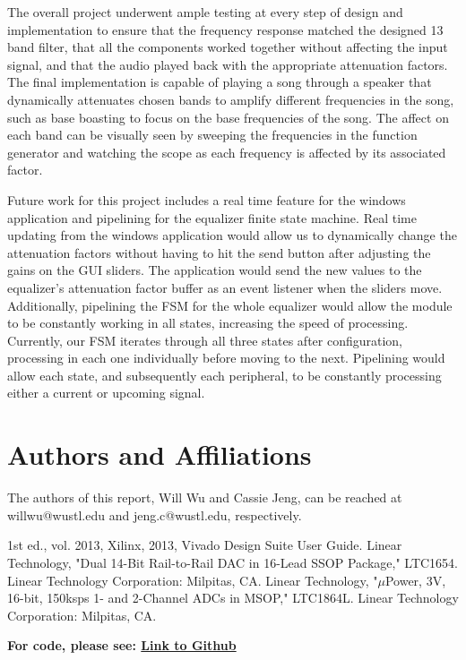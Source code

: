 \documentclass[journal]{IEEEtran} %
\begin{document}
The overall project underwent ample testing at every step of design and implementation to ensure that the frequency response matched the designed 13 band filter, that all the components worked together without affecting the input signal, and that the audio played back with the appropriate attenuation factors. The final implementation is capable of playing a song through a speaker that dynamically attenuates chosen bands to amplify different frequencies in the song, such as base boasting to focus on the base frequencies of the song. The affect on each band can be visually seen by sweeping the frequencies in the function generator and watching the scope as each frequency is affected by its associated factor.

Future work for this project includes a real time feature for the windows application and pipelining for the equalizer finite state machine. Real time updating from the windows application would allow us to dynamically change the attenuation factors without having to hit the send button after adjusting the gains on the GUI sliders. The application would send the new values to the equalizer's attenuation factor buffer as an event listener when the sliders move. Additionally, pipelining the FSM for the whole equalizer would allow the module to be constantly working in all states, increasing the speed of processing. Currently, our FSM iterates through all three states after configuration, processing in each one individually before moving to the next. Pipelining would allow each state, and subsequently each peripheral, to be constantly processing either a current or upcoming signal.

\section*{Authors and Affiliations}\label{sec:authors}
The authors of this report, Will Wu and Cassie Jeng, can be reached at willwu@wustl.edu and jeng.c@wustl.edu, respectively.

\begin{thebibliography}{00}
     1st ed., vol. 2013, Xilinx, 2013, Vivado Design Suite User Guide.
     Linear Technology, "Dual 14-Bit Rail-to-Rail DAC in 16-Lead SSOP Package," LTC1654. Linear Technology Corporation: Milpitas, CA.
     Linear Technology, "$\mu$Power, 3V, 16-bit, 150ksps 1- and 2-Channel ADCs in MSOP," LTC1864L. Linear Technology Corporation: Milpitas, CA.
\end{thebibliography}

\textbf{For code, please see: \href{https://github.com/WillWu88/FPGA_Project_Reports/tree/main/Code/EQ}{Link to Github}}
\end{document}
